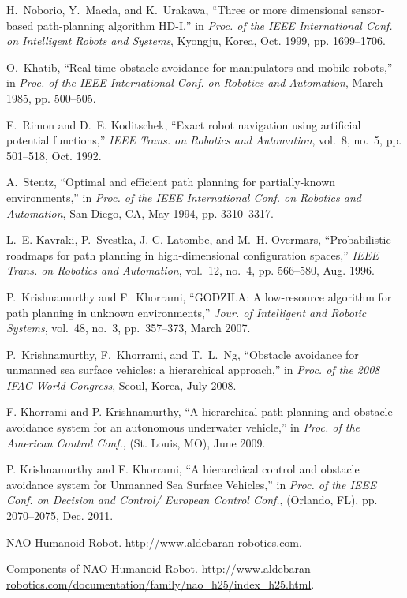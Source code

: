\documentclass[10pt,conference]{ieeeconf}
\begin{document}
\begin{thebibliography}{10}
H.~Noborio, Y.~Maeda, and K.~Urakawa, ``Three or more dimensional sensor-based
  path-planning algorithm {HD-I},'' in \emph{Proc. of the IEEE
  International Conf. on Intelligent Robots and Systems}, Kyongju, Korea,
  Oct. 1999, pp. 1699--1706.

O.~Khatib, ``Real-time obstacle avoidance for manipulators and mobile robots,''
  in \emph{Proc. of the IEEE International Conf. on Robotics and
  Automation}, March 1985, pp. 500--505.

E.~Rimon and D.~E. Koditschek, ``Exact robot navigation using artificial
  potential functions,'' \emph{IEEE Trans. on Robotics and Automation},
  vol.~8, no.~5, pp. 501--518, Oct. 1992.


A.~Stentz, ``Optimal and efficient path planning for partially-known
  environments,'' in \emph{Proc. of the IEEE International Conf. on
  Robotics and Automation}, San Diego, CA, May 1994, pp. 3310--3317.


L.~E. Kavraki, P.~Svestka, J.-C. Latombe, and M.~H. Overmars, ``Probabilistic
  roadmaps for path planning in high-dimensional configuration spaces,''
  \emph{IEEE Trans. on Robotics and Automation}, vol.~12, no.~4, pp.
  566--580, Aug. 1996.


P.~Krishnamurthy and F.~Khorrami, ``{GODZILA}: A low-resource algorithm for
  path planning in unknown environments,'' \emph{Jour. of Intelligent and Robotic Systems}, vol.~48, no.~3, pp.~357--373, March 2007.

  \vspace*{0.01in}
P.~Krishnamurthy, F.~Khorrami, and T.~L.~Ng, ``Obstacle avoidance for unmanned sea surface vehicles: a hierarchical approach,'' in \emph{Proc. of the 2008 IFAC World Congress}, Seoul, Korea, July 2008.

  \vspace*{0.01in}
F. Khorrami and P. Krishnamurthy, ``A hierarchical path planning and obstacle
avoidance system for an autonomous underwater vehicle,'' in \emph{Proc.
of the American Control Conf.}, (St. Louis, MO), June 2009.

  \vspace*{0.02in}
P. Krishnamurthy and F. Khorrami, ``A hierarchical control and obstacle
avoidance system for Unmanned Sea Surface Vehicles,'' in \emph{Proc. of
the IEEE Conf. on Decision and Control/ European Control Conf.},
(Orlando, FL), pp. 2070--2075, Dec. 2011.

  \vspace*{0.03in}
NAO Humanoid Robot. \url{http://www.aldebaran-robotics.com}.


  \vspace*{0.03in}
Components of NAO Humanoid Robot. \url{http://www.aldebaran-robotics.com/documentation/family/nao\_h25/index\_h25.html}.
\end{thebibliography}
\end{document}
